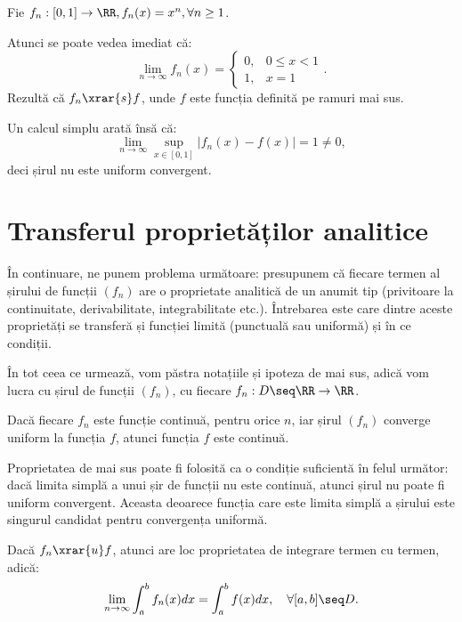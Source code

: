 Fie $ f_n : [0, 1] \to \RR, f_n(x) = x^n, \forall n \geq 1 $.

Atunci se poate vedea imediat că:
\[
    \lim_{n \to \infty} f_n(x) =%
    \begin{cases}
        0, & 0 \leq x < 1 \\
        1, & x = 1
    \end{cases}.
\]
Rezultă că $ f_n \xrar{s} f $, unde $ f $ este funcția definită pe ramuri
mai sus.

Un calcul simplu arată însă că:
\[
    \lim_{n \to \infty} \sup_{x \in [0, 1]} |f_n(x) - f(x)| = 1 \neq 0,
\]
deci șirul nu este uniform convergent.

\section{Transferul proprietăților analitice}

În continuare, ne punem problema următoare: presupunem că fiecare termen
al șirului de funcții $ (f_n) $ are o proprietate analitică de un anumit
tip (privitoare la continuitate, derivabilitate, integrabilitate etc.). 
Întrebarea este care dintre aceste proprietăți se transferă și funcției
limită (punctuală sau uniformă) și în ce condiții.

În tot ceea ce urmează, vom păstra notațiile și ipoteza de mai sus,
adică vom lucra cu șirul de funcții $ (f_n) $, cu fiecare
$ f_n : D \seq \RR \to \RR $.

\begin{theorem}\label{thm:transf-cont}
    Dacă fiecare $ f_n $ este funcție continuă, pentru orice $ n $,
    iar șirul $ (f_n) $ converge uniform la funcția $ f $, atunci
    funcția $ f $ este continuă.
\end{theorem}

Proprietatea de mai sus poate fi folosită ca o condiție suficientă
în felul următor: dacă limita simplă a unui șir de funcții nu este
continuă, atunci șirul nu poate fi uniform convergent. Aceasta deoarece
funcția care este limita simplă a șirului este singurul candidat pentru
convergența uniformă.

\begin{theorem}\label{thm:transf-int}
    Dacă $ f_n \xrar{u} f $, atunci are loc proprietatea de integrare
    termen cu termen, adică:
    \[
        \lim_{n \to \infty} \int_a^b f_n(x) dx = \int_a^b f(x) dx, \quad%
        \forall [a, b] \seq D.
    \]
\end{theorem}

